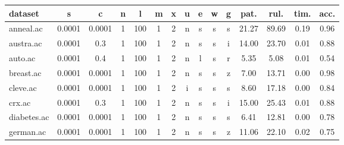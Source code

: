\begin{table}[htbp]
	\centering
		\renewcommand{\tabcolsep}{1.8mm}
		\resizebox{0.95\textwidth}{!} {
		\begin{tabular}{|l|c|c|c|c|c|c|c|c|c|c||c|c|c|c|}
		\hline
		\textbf{dataset}	& \textbf{s}	& \textbf{c}	& \textbf{n}	& \textbf{l}	& \textbf{m}	& \textbf{x}	& \textbf{u}	& \textbf{e} & \textbf{w} & \textbf{g} & \textbf{pat.}	& \textbf{rul.}	& \textbf{tim.}	& \textbf{acc.}	\\
		\hline
		anneal.ac      & 0.0001   & 0.0001      & 1              & 100                 & 1             & 2        & n             & s      & s        & s        & 21.27          & 89.69          & 0.19           & 0.96           \\
		\hline
		austra.ac      & 0.0001   & 0.3         & 1              & 100                 & 1             & 2        & n             & s      & s        & i        & 14.00          & 23.70          & 0.01           & 0.88           \\
		\hline
		auto.ac        & 0.0001   & 0.4         & 1              & 100                 & 1             & 2        & n             & l      & s        & r        & 5.35           & 5.08           & 0.01           & 0.54           \\
		\hline
		breast.ac      & 0.0001   & 0.0001      & 1              & 100                 & 1             & 2        & n             & s      & s        & z        & 7.00           & 13.71          & 0.00           & 0.98           \\
		\hline
		cleve.ac       & 0.0001   & 0.0001      & 1              & 100                 & 1             & 2        & i             & s      & s        & s        & 8.60           & 17.18          & 0.00           & 0.84           \\
		\hline
		crx.ac         & 0.0001   & 0.3         & 1              & 100                 & 1             & 2        & n             & s      & s        & i        & 15.00          & 25.43          & 0.01           & 0.88           \\
		\hline
		diabetes.ac    & 0.0001   & 0.0001      & 1              & 100                 & 1             & 2        & n             & s      & s        & s        & 6.41           & 12.81          & 0.00           & 0.78           \\
		\hline
		german.ac      & 0.0001   & 0.0001      & 1              & 100                 & 1             & 2        & n             & s      & s        & z        & 11.06          & 22.10          & 0.02           & 0.75           \\

\end{tabular}}
\end{table}
